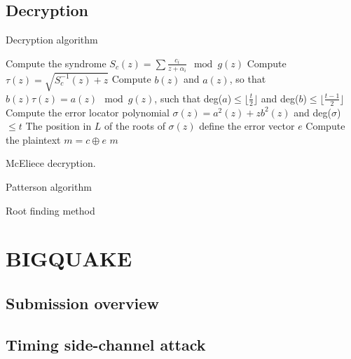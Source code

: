 \subsection{Decryption}
\label{sub:mc-dec}
Decryption algorithm

\begin{algorithm}[H]
 Compute the syndrome $S_c(z) = \sum{\frac{c_i}{z+\alpha_i}} \mod g(z)$\;
 Compute $\tau(z) = \sqrt{S^{-1}_{c}(z)+z}$\;
 Compute $b(z)$ and $a(z)$, so that $b(z)\tau(z) = a(z) \mod g(z)$, such that deg($a$)$\leq \lfloor \frac{t}{2} \rfloor$ and deg($b$)$\leq \lfloor \frac{t-1}{2} \rfloor$\;
 Compute the error locator polynomial $\sigma(z) = a^2(z) + zb^2(z)$ and deg($\sigma$) $\leq t$\;
 The position in $L$ of the roots of $\sigma(z)$ define the error vector $e$\;
 Compute the plaintext $m = c \oplus e$\;
 \Return $m$\;
 \caption{McEliece decryption.}\label{alg:3}
\end{algorithm}

Patterson algorithm

Root finding method


\section{BIGQUAKE}
\subsection{Submission overview}
\subsection{Timing side-channel attack}